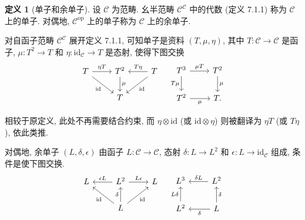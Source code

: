 \documentclass[11pt]{article}
\newcommand{\identity}{\mathrm{id}}
\newcommand{\opp}{\mathrm{op}}
\renewcommand{\index}[2][]{\relax}
\newcommand{\CorpusNumber}{0}
\theoremstyle{definition}
\newtheorem{definition}[theorem]{定义}
\begin{document}
\def\CorpusNumber{7.6.1}
\begin{definition}[单子和余单子]\label{def:monad}
	\index{danzi@单子 (monad)}
	\index{yudanzi@余单子 (comonad)}
	设 $\mathcal{C}$ 为范畴. 幺半范畴 $\mathcal{C}^{\mathcal{C}}$ 中的代数 (定义 7.1.1) 称为 $\mathcal{C}$ 上的单子. 对偶地, $\mathcal{C}^{\opp}$ 上的单子称为 $\mathcal{C}$ 上的余单子.
\end{definition}

对自函子范畴 $\mathcal{C}^{\mathcal{C}}$ 展开定义 7.1.1, 可知单子是资料 $(T, \mu, \eta)$, 其中 $T: \mathcal{C} \to \mathcal{C}$ 是函子, $\mu: T^2 \to T$ 和 $\eta: \identity_{\mathcal{C}} \to T$ 是态射, 使得下图交换
\begin{equation*}\begin{gathered}
	\begin{tikzcd}
		T \arrow[r, "{\eta T}"] \arrow[rd, "\identity"'] & T^2 \arrow[d, "\mu"] & T \arrow[l, "{T\eta}"'] \arrow[ld, "\identity"] \\
		& T &
	\end{tikzcd} \quad
	\begin{tikzcd}
		T^3 \arrow[r, "\mu T"] \arrow[d, "T\mu"'] & T^2 \arrow[d, "\mu"] \\
		T^2 \arrow[r, "\mu"'] & T.
	\end{tikzcd}
\end{gathered}\end{equation*}

相较于原定义, 此处不再需要结合约束, 而 $\eta \otimes \identity$ (或 $\identity \otimes \eta$) 则被翻译为 $\eta T$ (或 $T\eta$), 依此类推.

对偶地, 余单子 $(L, \delta, \epsilon)$ 由函子 $L: \mathcal{C} \to \mathcal{C}$, 态射 $\delta: L \to L^2$ 和 $\epsilon: L \to \identity_{\mathcal{C}}$ 组成, 条件是使下图交换.
\begin{equation*}\begin{gathered}
	\begin{tikzcd}
		L  & L^2 \arrow[l, "{\epsilon L}"'] \arrow[r, "{L\epsilon}"] & L \\
		& L \arrow[lu, "\identity"] \arrow[ru, "\identity"'] \arrow[u, "\delta"] &
	\end{tikzcd} \quad
	\begin{tikzcd}
		L^3 & L^2 \arrow[l, "\delta L"'] \\
		L^2 \arrow[u, "L\delta"] & L \arrow[u, "\delta"'] \arrow[l, "\delta"]
	\end{tikzcd}
\end{gathered}\end{equation*}
\end{document}

